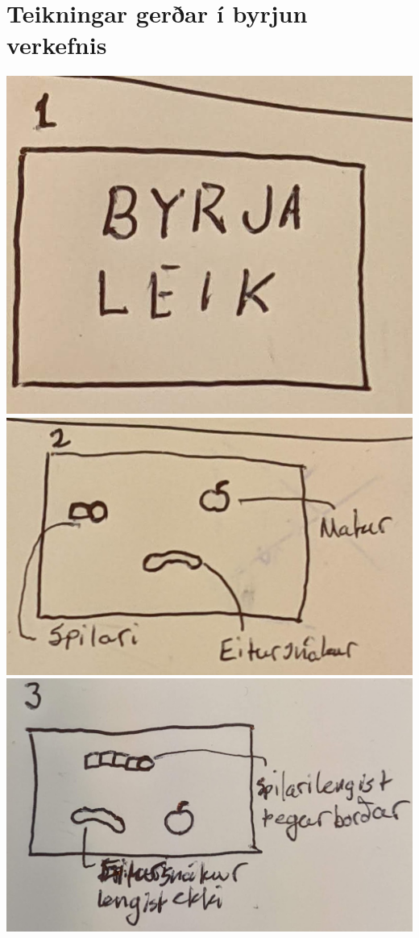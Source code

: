 \documentclass{article}
\begin{document}
\section*{Teikningar gerðar í byrjun verkefnis}
\begin{center}
    \includegraphics[scale=0.2]{t1.jpg}
    \includegraphics[scale=0.2]{t2.jpg}
    \includegraphics[scale=0.2]{t3.jpg}

\end{center}
\end{document}
